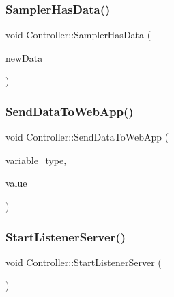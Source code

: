 \mbox{\label{classController_a4b765eaaf8f72e964118967f86c265e2}} 
\subsubsection{\texorpdfstring{Sampler\+Has\+Data()}{SamplerHasData()}}
{\footnotesize\ttfamily void Controller\+::\+Sampler\+Has\+Data (\begin{DoxyParamCaption}\item[{\hyperlink{structEnvironmentData}{Environment\+Data}}]{new\+Data }\end{DoxyParamCaption})}

\mbox{\label{classController_a9d59ef3807f630a52c964a899a7235dd}} 
\subsubsection{\texorpdfstring{Send\+Data\+To\+Web\+App()}{SendDataToWebApp()}}
{\footnotesize\ttfamily void Controller\+::\+Send\+Data\+To\+Web\+App (\begin{DoxyParamCaption}\item[{std\+::string}]{variable\+\_\+type,  }\item[{float}]{value }\end{DoxyParamCaption})\hspace{0.3cm}{\ttfamily [private]}}

\mbox{\label{classController_a64173dd00be020975d7db533cd280c15}} 
\subsubsection{\texorpdfstring{Start\+Listener\+Server()}{StartListenerServer()}}
{\footnotesize\ttfamily void Controller\+::\+Start\+Listener\+Server (\begin{DoxyParamCaption}{ }\end{DoxyParamCaption})}

